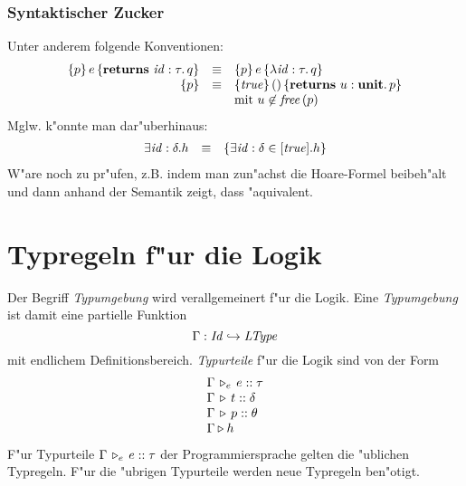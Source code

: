 \documentclass[12pt,a4paper,bigheadings]{scrartcl}
\newcommand{\Tje}[3]{#1 \,\tr_e\, #2\cc#3}
\begin{document}
\subsubsection{Syntaktischer Zucker}

Unter anderem folgende Konventionen:
\[\begin{array}{rcl}
  \{p\}\,e\,\{{\bf returns}\ {\text{\it id\/}}:\tau.\, q\} &\equiv& \{p\}\,e\,\{\lambda {\text{\it id\/}}:\tau.\,q\} \\
  \{p\} &\equiv& \{{\text{\it true\/}}\}\,()\,\{{\bf returns}\ u:\textbf{unit}.\, p\} \\
  && \text{mit $u \not \in {\text{\it free\/}}\,(p)$}
\end{array}\]
Mglw. k"onnte man dar"uberhinaus:
\[\begin{array}{rcl}
  \exists {\text{\it id\/}}:\delta.h &\equiv& \{\exists {\text{\it id\/}}:\delta\in [{\text{\it true\/}}]. h\}
\end{array}\]
W"are noch zu pr"ufen, z.B. indem man zun"achst die Hoare-Formel beibeh"alt und
dann anhand der Semantik zeigt, dass "aquivalent.


\section{Typregeln f"ur die Logik}

Der Begriff {\em Typumgebung} wird verallgemeinert f"ur die Logik. Eine {\em Typumgebung} ist
damit eine partielle Funktion
\[
  \Gamma: {\text{\it Id\/}} \hookrightarrow {\text{\it LType\/}}
\]
mit endlichem Definitionsbereich. {\em Typurteile} f"ur die Logik sind von der Form
\[\begin{array}{l}
  \Tje{\Gamma}{e}{\tau} \\
  \Tj{\Gamma}{t}{\delta} \\
  \Tj{\Gamma}{p}{\theta} \\
  \Tjh{\Gamma}{h}
\end{array}\]
F"ur Typurteile $\Tje{\Gamma}{e}{\tau}$ der Programmiersprache gelten die "ublichen Typregeln.
F"ur die "ubrigen Typurteile werden neue Typregeln ben"otigt.
\end{document}
